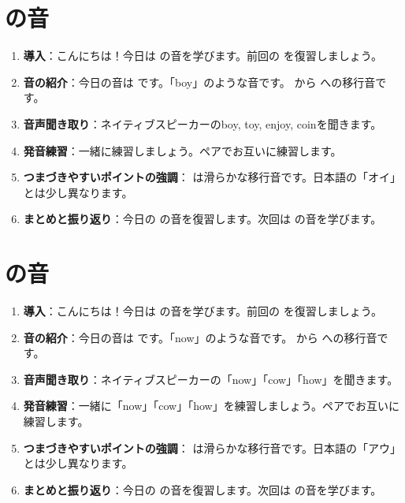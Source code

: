 \documentclass[book,jafontscale=0.9247]{jlreq}
\begin{document}
\section{ の音}
\begin{enumerate}
    \item \textbf{導入}：こんにちは！今日は  の音を学びます。前回の  を復習しましょう。
    \item \textbf{音の紹介}：今日の音は  です。「boy」のような音です。  から  への移行音です。
    \item \textbf{音声聞き取り}：ネイティブスピーカーのboy, toy, enjoy, coinを聞きます。
    \item \textbf{発音練習}：一緒に練習しましょう。ペアでお互いに練習します。
    \item \textbf{つまづきやすいポイントの強調}：  は滑らかな移行音です。日本語の「オイ」とは少し異なります。
    \item \textbf{まとめと振り返り}：今日の  の音を復習します。次回は  の音を学びます。
\end{enumerate}
\newpage
\section{ の音}
\begin{enumerate}
    \item \textbf{導入}：こんにちは！今日は  の音を学びます。前回の  を復習しましょう。
    \item \textbf{音の紹介}：今日の音は  です。「now」のような音です。  から  への移行音です。
    \item \textbf{音声聞き取り}：ネイティブスピーカーの「now」「cow」「how」を聞きます。
    \item \textbf{発音練習}：一緒に「now」「cow」「how」を練習しましょう。ペアでお互いに練習します。
    \item \textbf{つまづきやすいポイントの強調}：  は滑らかな移行音です。日本語の「アウ」とは少し異なります。
    \item \textbf{まとめと振り返り}：今日の  の音を復習します。次回は  の音を学びます。
\end{enumerate}
\end{document}
